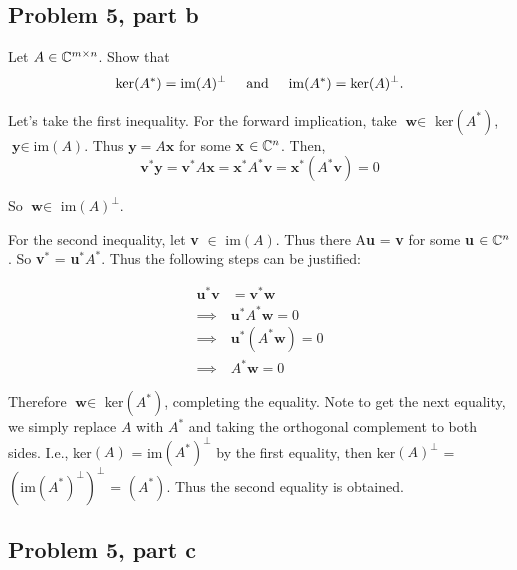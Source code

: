 \subsection{Problem 5, part b}
Let $A \in \mathbb{C}^{m\times n}$. Show that
\[
\text{ker}(A^*) = \text{im}(A)^\perp \hspace{5mm} \text{and} \hspace{5mm} \text{im}(A^*) = \text{ker}(A)^\perp.
\]

\partbreak
\begin{solution}

    Let's take the first inequality. For the forward implication, take $\textbf{w} \in $ ker$(A^*)$, $\textbf{y} \in $im$(A)$. Thus $\textbf{y} = A\textbf{x}$ for some \textbf{x} $\in \mathbb{C}^n$. Then,
    \[
    \textbf{v}^* \textbf{y} = \textbf{v}^*A\textbf{x} = \textbf{x}^*A^*\textbf{v} = \textbf{x}^*(A^*\textbf{v}) = 0
    \]

    So $\textbf{w} \in$ im$(A)^\perp$. 

    For the second inequality, let \textbf{v} $\in$ im$(A)$. Thus there A\textbf{u} = \textbf{v} for some \textbf{u} $\in \mathbb{C}^n$. So \textbf{v}$^*$ = \textbf{u}$^*A^*$. Thus the following steps can be justified:

\alignbreak
\begin{align}
    \textbf{u}^* \textbf{v} &=\textbf{v}^* \textbf{w}\nonumber\\
    \implies &\textbf{u}^*A^*\textbf{w} = 0\nonumber\\
    \implies &\textbf{u}^*(A^*\textbf{w}) = 0\nonumber\\
    \implies &A^*\textbf{w} = 0\nonumber
\end{align}
\alignbreak

Therefore $\textbf{w} \in $ ker$(A^*)$, completing the equality. Note to get the next equality, we simply replace $A$ with $A^*$ and taking the orthogonal complement to both sides. I.e., ker$(A)$ = im$(A^*)^\perp$ by the first equality, then  ker$(A)^\perp$ = $(\text{im}(A^*)^\perp)^\perp$ = $(A^*)$. Thus the second equality is obtained. 
\end{solution}

\newpage
\subsection{Problem 5, part c}

